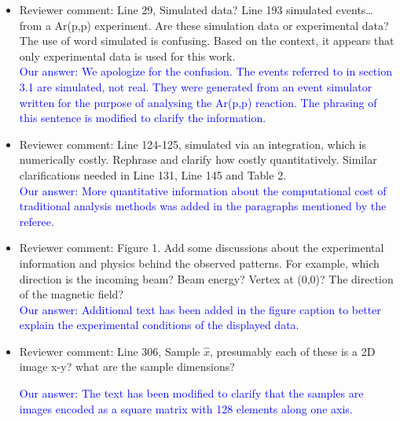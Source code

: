 \documentclass[12pt]{article}
\begin{document}
\begin{itemize}
\item Reviewer comment: Line 29, Simulated data? Line 193 simulated events… from a Ar(p,p) experiment. Are these
simulation data or experimental data? The use of word simulated is confusing. Based on the context,
it appears that only experimental data is used for this work.\\
\textcolor{blue}{Our answer: We apologize for the confusion. The events referred to in section 3.1 are simulated, not real. They were generated from an event simulator written for the purpose of analysing the Ar(p,p) reaction. The phrasing of this sentence is modified to clarify the information.}
\item Reviewer comment: Line 124-125, simulated via an integration, which is numerically costly. Rephrase and clarify how
costly quantitatively. Similar clarifications needed in Line 131, Line 145 and Table 2.\\
\textcolor{blue}{Our answer: More quantitative information about the computational cost of traditional analysis methods was added in the paragraphs mentioned by the referee.}
\item Reviewer comment: Figure 1. Add some discussions about the experimental information and physics behind the
observed patterns. For example, which direction is the incoming beam? Beam energy? Vertex at
(0,0)? The direction of the magnetic field?\\

\textcolor{blue}{Our answer: Additional text has been added in the figure caption to better explain the experimental conditions of the displayed data.}
\item Reviewer comment: Line 306, Sample $\hat{x}$, presumably each of these is a 2D image x-y? what are the sample
dimensions?

\textcolor{blue}{Our answer: The text has been modified to clarify that the samples are images encoded as a square matrix with 128 elements along one axis.}
    

\end{itemize}
\end{document}

